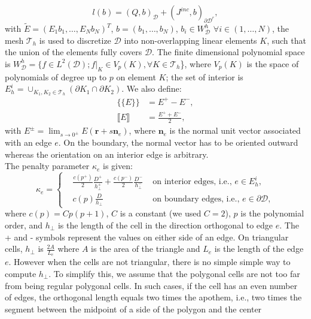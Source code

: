 \documentclass[preprint,10pt]{elsarticle}
\newcommand\br{\mathbf{r}}
\newcommand\bs{\boldsymbol}
\newcommand\ldb{\{\!\!\{}
\newcommand\rdb{\}\!\!\}}
\newcommand\llb{\llbracket}
\newcommand\rrb{\rrbracket}
\newcommand\mc{\mathcal}
\renewcommand{\(}{\left(}
\renewcommand{\)}{\right)}
\renewcommand{\[}{\left[}
\renewcommand{\]}{\right]}
\begin{document}
\begin{equation}
  l(b) = (Q,b)_{\mc{D}} + (J^{inc},b)_{\partial
  \mc{D}^r},
\end{equation}
with $\tilde{E}=(E_1 b_1,\hdots, E_N b_N)^T$, $b = (b_1,\hdots,b_N)$,
$b_i \in W_{\mc{D}}^h$ $\forall i \in (1,\hdots,N)$,
the mesh $\mc{T}_h$ is used to discretize $\mc{D}$ into non-overlapping linear
elements $K$, such that the union of the elements fully covers $\mc{D}$. The
finite dimensional polynomial space is $W_{\mc{D}}^h = \{f \in L^2(\mc{D});
f|_K \in V_p(K), \forall K \in \mc{T}_h$\}, where $V_p(K)$ is the space of
polynomials of degree up to $p$ on element $K$; the set of interior is $E_h^i
= \cup_{K_1,K_2\in \mc{T}_h}(\partial K_1 \cap \partial K_2)$. We also
define:
\begin{align}
  \ldb E \rdb &= E^+ - E^-,\\
  \llb E \rrb &=  \frac{E^+ + E^-}{2},
\end{align}
with $E^{\pm} = \lim_{s\rightarrow 0^{\pm}} E(\br+s \bs{n}_e)$, where
$\bs{n}_e$ is the normal unit vector associated with an edge $e$. On the boundary, 
the normal vector has to be oriented outward whereas the orientation on an
interior edge is arbitrary.\\
The penalty parameter $\kappa_e$ is given:
\begin{equation}
  \kappa_e = \left\{
    \begin{aligned}
      &\frac{c(p^+)}{2}\frac{D^+}{h_{\bot}^+}+\frac{c(p^-)}{2}
      \frac{D^-}{h_{\bot}^-} & \textrm{ on interior edges, i.e., } e \in
      E_h^i,\\
      & c(p)\frac{D}{h_{\bot}} & \textrm{ on boundary edges, i.e., } e\in
      \partial \mc{D},
    \end{aligned}
    \right.
\end{equation}
where $c(p) =Cp(p+1)$, $C$ is a constant (we used $C=2$), $p$ is the
polynomial order,  and $h_{\bot}$ is the length of the cell in the direction 
orthogonal to edge $e$. The + and - symbols represent the values on either 
side of an edge. On triangular cells, $h_{\bot}$ is $\frac{2A}{L_e}$ where $A$
is the area of the triangle and $L_e$ is the length of the edge $e$. However
when the cells are not triangular, there is no simple simple way to compute
$h_{\bot}$. To simplify this, we assume that the polygonal cells are not too
far from being regular polygonal cells. In such cases, if the cell has an even
number of edges, the orthogonal length equals two times the apothem, i.e., two
times the segment between the midpoint of a side of the polygon and the center
\end{document}
